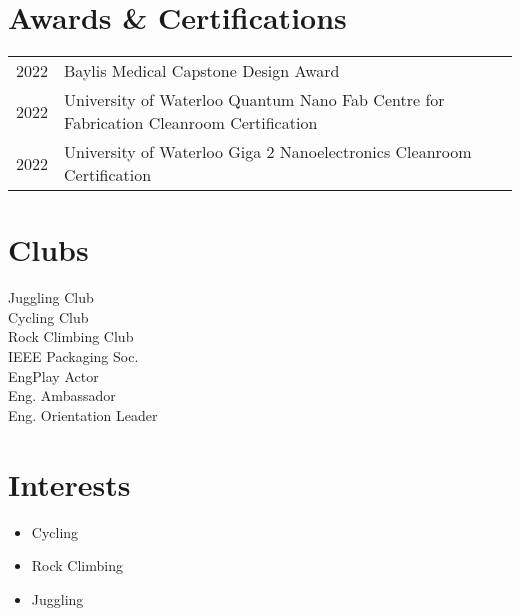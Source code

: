 \documentclass[]{chandan-cv}
\begin{document}
\begin{minipage}[t]{0.77\textwidth}

\section{Awards \& Certifications}
\begin{tabular}{rll}
	2022		&	Baylis Medical Capstone Design Award\\
	2022		&	University of Waterloo Quantum Nano Fab Centre for Fabrication Cleanroom Certification \\
	2022		&	University of Waterloo Giga 2 Nanoelectronics Cleanroom Certification \\
\end{tabular}
\sectionsep
\end{minipage}
\hfill
\begin{minipage}[t]{0.20\textwidth}

\section{Clubs}
Juggling Club \\
Cycling Club \\
Rock Climbing Club \\
IEEE Packaging Soc. \\
EngPlay Actor \\
Eng. Ambassador \\
Eng. Orientation Leader

\section{Interests}
\begin{itemize}
	\setlength\itemsep{-0.3em}
    \item Cycling
	\item Rock Climbing
	\item Juggling
\end{itemize}
\end{minipage}

%
%
\end{document}
